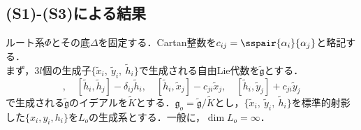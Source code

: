 \documentclass[rep_main]{subfiles}
\begin{document}
\subsection{(S1)-(S3)による結果}
ルート系$\Phi$とその底$\Delta$を固定する．Cartan整数を$c_{ij} = \sspair{\alpha_i}{\alpha_j}$と略記する．\\
まず，$3l$個の生成子$\{\tilde{x}_i,\ \tilde{y}_i,\ \tilde{h}_i\}$で生成される自由Lie代数を$\tilde{\mathfrak{g}}$とする．
\begin{equation}
	[\tilde{h}_i, \tilde{h}_j],\quad  [\tilde{h}_i, \tilde{h}_j] - \delta_{ij}\tilde{h}_i,\quad  [\tilde{h}_i, \tilde{x}_j] - c_{ji}\tilde{x}_j,\quad  [\tilde{h}_i, \tilde{y}_j] + c_{ji}\tilde{y}_j
\end{equation}
で生成される$\tilde{\mathfrak{g}}$のイデアルを$\tilde{K}$とする．$\mathfrak{g}_o = \tilde{\mathfrak{g}} / \tilde{K}$とし，$\{\tilde{x}_i,\ \tilde{y}_i,\ \tilde{h}_i\}$を標準的射影した$\{x_i, y_i, h_i\}$を$L_o$の生成系とする．一般に，$\dim L_o = \infty$．
\end{document}
